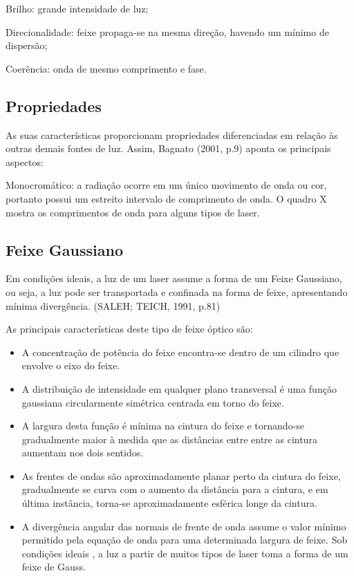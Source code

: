 \documentclass[numeric]{fei}
\begin{document}
Brilho: grande intensidade de luz;

Direcionalidade: feixe propaga-se na mesma direção, havendo um mínimo de dispersão;

Coerência: onda de mesmo comprimento e fase.

\subsection{Propriedades}

As suas características proporcionam propriedades diferenciadas em relação às outras demais fontes de luz. Assim, Bagnato (2001, p.9) aponta os principais aspectos:

Monocromático: a radiação ocorre em um único movimento de onda ou cor, portanto possui um estreito intervalo de comprimento de onda. O quadro X mostra os comprimentos de onda para alguns tipos de laser.

\subsection{Feixe Gaussiano}

Em condições ideais, a luz de um laser assume a forma de um Feixe Gaussiano, ou seja, a luz pode ser transportada e confinada na forma de feixe, apresentando mínima divergência. (SALEH; TEICH, 1991, p.81)

As principais características deste tipo de feixe óptico são:

\begin{itemize}
	\item A concentração de potência do feixe encontra-se dentro de um cilindro que envolve o eixo do feixe.
	\item A distribuição de intensidade em qualquer plano transversal é uma função gaussiana circularmente simétrica centrada em torno do feixe.
	\item A largura desta função é mínima na cintura do feixe e tornando-se gradualmente maior à medida que as distâncias entre entre as cintura aumentam nos dois sentidos.
	\item As frentes de ondas são aproximadamente planar perto da cintura do feixe, gradualmente se curva com o aumento da distância para a cintura, e em última instância, torna-se aproximadamente esférica longe da cintura.
	\item A divergência angular das normais de frente de onda assume o valor mínimo permitido pela equação de onda para uma determinada largura de feixe. Sob condições ideais , a luz a partir de muitos tipos de laser toma a forma de um feixe de Gauss.
\end{itemize}
\end{document}
